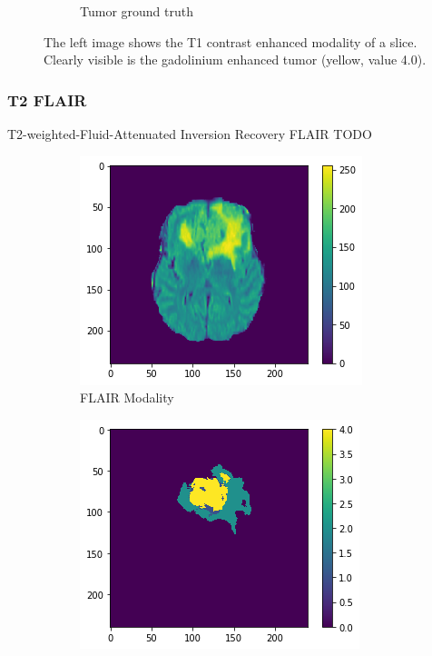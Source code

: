 \begin{figure}[H]
\begin{subfigure}{.5\textwidth}
        \caption{Tumor ground truth}
    \end{subfigure}
    \caption{The left image shows the T1 contrast enhanced modality of a slice. Clearly visible is the gadolinium enhanced tumor (yellow, value 4.0).}
    \label{medical_background_t1ce}
\end{figure}



\subsubsection{T2 FLAIR}
T2-weighted-Fluid-Attenuated Inversion Recovery
FLAIR \cite{mribasics} 
TODO

\begin{figure}[H]
    \centering
    \begin{subfigure}{.5\textwidth}
        \centering
        \includegraphics[width=\linewidth]{chapters/04_segmentation/images/medical_background/flair.png}
        \caption{FLAIR Modality}
    \end{subfigure}%
    \begin{subfigure}{.5\textwidth}
        \centering
        \includegraphics[width=\linewidth]{chapters/04_segmentation/images/medical_background/tumor.png}

\end{subfigure}
\end{figure}
